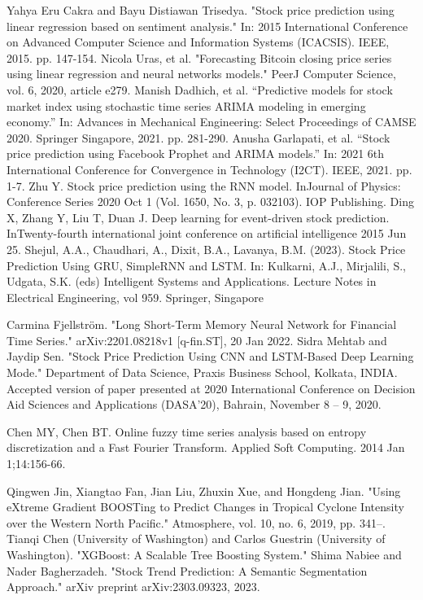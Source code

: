 \documentclass{ieeeojies}
\begin{document}
\begin{thebibliography}{00}
Yahya Eru Cakra and Bayu Distiawan Trisedya. "Stock price prediction using linear regression based on sentiment analysis." In: 2015 International Conference on Advanced Computer Science and Information Systems (ICACSIS). IEEE, 2015. pp. 147-154.
Nicola Uras, et al. "Forecasting Bitcoin closing price series using linear regression and neural networks models." PeerJ Computer Science, vol. 6, 2020, article e279.
Manish Dadhich, et al. ``Predictive models for stock market index using stochastic time series ARIMA modeling in emerging economy.'' In: Advances in Mechanical Engineering: Select Proceedings of CAMSE 2020. Springer Singapore, 2021. pp. 281-290.
Anusha Garlapati, et al. ``Stock price prediction using Facebook Prophet and ARIMA models.'' In: 2021 6th International Conference for Convergence in Technology (I2CT). IEEE, 2021. pp. 1-7.
Zhu Y. Stock price prediction using the RNN model. InJournal of Physics: Conference Series 2020 Oct 1 (Vol. 1650, No. 3, p. 032103). IOP Publishing. 
Ding X, Zhang Y, Liu T, Duan J. Deep learning for event-driven stock prediction. InTwenty-fourth international joint conference on artificial intelligence 2015 Jun 25.
Shejul, A.A., Chaudhari, A., Dixit, B.A., Lavanya, B.M. (2023). Stock Price Prediction Using GRU, SimpleRNN and LSTM. In: Kulkarni, A.J., Mirjalili, S., Udgata, S.K. (eds) Intelligent Systems and Applications. Lecture Notes in Electrical Engineering, vol 959. Springer, Singapore 

Carmina Fjellström. "Long Short-Term Memory Neural Network for Financial Time Series." arXiv:2201.08218v1 [q-fin.ST], 20 Jan 2022.
Sidra Mehtab and Jaydip Sen. "Stock Price Prediction Using CNN and LSTM-Based Deep Learning Mode." Department of Data Science, Praxis Business School, Kolkata, INDIA. Accepted version of paper presented at 2020 International Conference on Decision Aid Sciences and Applications (DASA’20), Bahrain, November 8 – 9, 2020.

Chen MY, Chen BT. Online fuzzy time series analysis based on entropy discretization and a Fast Fourier Transform. Applied Soft Computing. 2014 Jan 1;14:156-66. 

Qingwen Jin, Xiangtao Fan, Jian Liu, Zhuxin Xue, and Hongdeng Jian. "Using eXtreme Gradient BOOSTing to Predict Changes in Tropical Cyclone Intensity over the Western North Pacific." Atmosphere, vol. 10, no. 6, 2019, pp. 341–.
Tianqi Chen (University of Washington) and Carlos Guestrin (University of Washington). "XGBoost: A Scalable Tree Boosting System."
Shima Nabiee and Nader Bagherzadeh. "Stock Trend Prediction: A Semantic Segmentation Approach." arXiv preprint arXiv:2303.09323, 2023.


\end{thebibliography}
\end{document}
